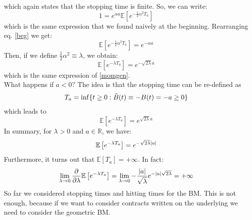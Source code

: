which again states that the stopping time is finite. So, we can write:
\begin{equation}\label{beg}
    1 = e^{\alpha a}\mathbb{E}\left[e^{-\frac{1}{2}\alpha^2 T_a}\right]
\end{equation}
which is the same expression that we found naively at the beginning. Rearranging eq. \eqref{beg} we get:
\begin{equation}
    \mathbb{E}\left[e^{-\frac{1}{2}\alpha^2 T_a}\right] = e^{-\alpha a}
\end{equation}
Then, if we define $\frac{1}{2}\alpha^2 \equiv \lambda$, we obtain:
\begin{equation}
    \mathbb{E}\left[e^{-\lambda T_a}\right] = e^{-\sqrt{2\lambda} a}
\end{equation}
which is the same expression of \eqref{momgen}.\\
What happens if $a<0$? The idea is that the stopping time can be re-defined as
\begin{equation}
    T_a = \inf\{t\ge0: \Tilde{B}(t) \equiv -B(t) = -a \ge 0\}
\end{equation}
which leads to 
\begin{equation}
    \mathbb{E}\left[e^{-\lambda T_a}\right] = e^{\sqrt{2\lambda} a}
\end{equation}
In summary, for $\lambda > 0$ and $a\in\mathbb{R}$, we have:
\begin{equation}
    \mathbb{E}\left[e^{-\lambda T_a}\right] = e^{-\sqrt{2\lambda} \abs{a}}
\end{equation}
Furthermore, it turns out that $\mathbb{E}[T_a]=+\infty$. In fact:
\begin{equation}
    \lim_{\lambda\to0}\pdv{}{\lambda}\mathbb{E}\left[e^{-\lambda T_a}\right] = \lim_{\lambda\to0}-\frac{\abs{a}}{\sqrt{\lambda}}e^{-\abs{a}\sqrt{2\lambda}} = +\infty
\end{equation}
So far we considered stopping times and hitting times for the BM. This is not enough, because if we want to consider contracts written on the underlying we need to consider the geometric BM.